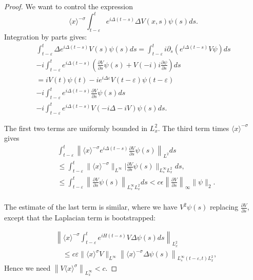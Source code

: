 \documentclass[11pt]{article}
\begin{document}
\begin{proof}
We want to control the expression
$$
\langle x\rangle^{-\sigma} \int_{t-\varepsilon}^{t} e^{i \Delta(t-s)} \Delta V(x, s) \psi(s) d s .
$$
Integration by parts gives:
$$
\begin{gathered}
\int_{t-\varepsilon}^{t} \Delta e^{i \Delta(t-s)} V(s) \psi(s) d s=\int_{t-\varepsilon}^{t} i \partial_{s}\left(e^{i \Delta(t-s)} V \psi\right) d s \\
-i \int_{t-\varepsilon}^{t} e^{i \Delta(t-s)}\left(\frac{\partial V}{\partial s} \psi(s)+V(-i) i \frac{\partial \psi}{\partial s}\right) d s \\
=i V(t) \psi(t)-i e^{i \Delta \varepsilon} V(t-\varepsilon) \psi(t-\varepsilon) \\
-i \int_{t-\varepsilon}^{t} e^{i \Delta(t-s)} \frac{\partial V}{\partial s} \psi(s) d s \\
-i \int_{t-\varepsilon}^{t} e^{i \Delta(t-s)} V(-i \Delta-i V) \psi(s) d s .
\end{gathered}
$$

The first two terms are uniformly bounded in $L_{x}^{2}$. The third term times $\langle x\rangle^{-\sigma}$ gives
$$
\begin{aligned}
& \int_{t-\varepsilon}^{t}\left\|\langle x\rangle^{-\sigma} e^{i \Delta(t-s)} \frac{\partial V}{\partial s} \psi(s)\right\|_{L^{2}} d s \\
& \leqslant \int_{t-\varepsilon}^{t}\|\langle x\rangle^{-\sigma}\|_{L^{\infty}}
|\frac{\partial V}{\partial s} \psi(s)\|_{L_{s}^{\infty} L_{x}^{2}} d s, \\
& \leq \int_{t-\varepsilon}^{t}\left\| \frac{\partial V}{\partial s} \psi(s)\right\|_{L_{s}^{\infty} L_{x}^{2}} d s<c \epsilon \left\| \frac{\partial V}{\partial s}\right \|_{\infty} \|\psi\|_2 . \\
\end{aligned}
$$

The estimate of the last term is similar, where we have $V^{2} \psi(s)$ replacing $\frac{\partial V}{\partial s}$, except that the Laplacian term is bootstrapped:

$$
\begin{aligned}
& \left\|\langle x\rangle^{-\sigma} \int_{t-\varepsilon}^{t} e^{i H(t-s)} V \Delta \psi(s) d s\right\|_{L^{2}_x} \\
& \quad \leqslant c \varepsilon \|\langle x\rangle^{\sigma}V\|_{L^{\infty}}\left\|\langle x\rangle^{-\sigma} \Delta \psi(s)\right\|_{L_{s}^{\infty}(t-\varepsilon, t) L_{x}^{2}},
\end{aligned}
$$
 Hence we need $\left\|V\langle x\rangle^{\sigma}\right\|_{L^{\infty}_x}<c$.
\end{proof}
\end{document}
